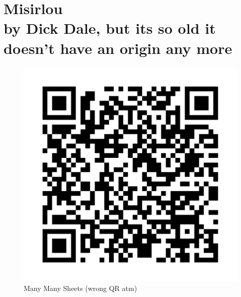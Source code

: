 \chapter[Misirlou]{Misirlou\\[1ex]\large{by Dick Dale, but its so old it doesn't have an origin any more}}

\begin{figure}
\includegraphics[width=1\linewidth]{QR_Codes/QR_SultansOfSwing_BassChords.png}\\
Many Many Sheets (wrong QR atm)
\end{figure}

